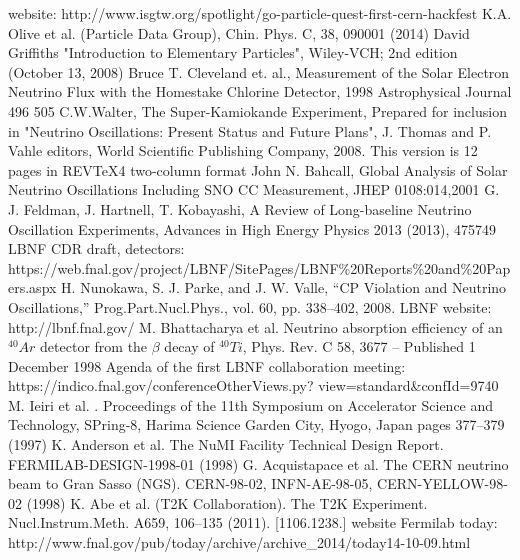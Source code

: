 \begin{thebibliography}{1}
    website: http://www.isgtw.org/spotlight/go-particle-quest-first-cern-hackfest
    K.A. Olive et al. (Particle Data Group), Chin. Phys. C, 38, 090001 (2014) 
    David Griffiths "Introduction to Elementary Particles", Wiley-VCH; 2nd edition (October 13, 2008)
    Bruce T. Cleveland et. al., Measurement of the Solar Electron Neutrino Flux with the Homestake Chlorine Detector, 1998 Astrophysical Journal 496 505
    C.W.Walter, The Super-Kamiokande Experiment, Prepared for inclusion in "Neutrino Oscillations: Present Status and Future Plans", J. Thomas and P. Vahle editors, World Scientific Publishing Company, 2008. This version is 12 pages in REVTeX4 two-column format
    John N. Bahcall, Global Analysis of Solar Neutrino Oscillations Including SNO CC Measurement, JHEP 0108:014,2001
    G. J. Feldman, J. Hartnell, T. Kobayashi, A Review of Long-baseline Neutrino Oscillation Experiments, Advances in High Energy Physics 2013 (2013), 475749
    LBNF CDR draft, detectors: https://web.fnal.gov/project/LBNF/SitePages/LBNF\%20Reports\%20and\%20Papers.aspx
    H. Nunokawa, S. J. Parke, and J. W. Valle, “CP Violation and Neutrino Oscillations,”
Prog.Part.Nucl.Phys., vol. 60, pp. 338–402, 2008.
    LBNF website: http://lbnf.fnal.gov/
    M. Bhattacharya et al. Neutrino absorption efficiency of an $^{40}Ar$ detector from the $\beta$ decay of $^{40}Ti$, Phys. Rev. C 58, 3677 – Published 1 December 1998
    Agenda of the first LBNF collaboration meeting: https://indico.fnal.gov/conferenceOtherViews.py? view=standard\&confId=9740
    M. Ieiri et al. . Proceedings of the 11th Symposium on Accelerator Science and Technology, SPring-8,
Harima Science Garden City, Hyogo, Japan pages 377–379 (1997)
    K. Anderson et al. The NuMI Facility Technical Design Report. FERMILAB-DESIGN-1998-01 (1998)
    G. Acquistapace et al. The CERN neutrino beam to Gran Sasso (NGS). CERN-98-02, INFN-AE-98-05,
CERN-YELLOW-98-02 (1998)
    K. Abe et al. (T2K Collaboration). The T2K Experiment. Nucl.Instrum.Meth. A659, 106–135 (2011).
[1106.1238.]
    website Fermilab today: http://www.fnal.gov/pub/today/archive/archive\_2014/today14-10-09.html
\end{thebibliography}
